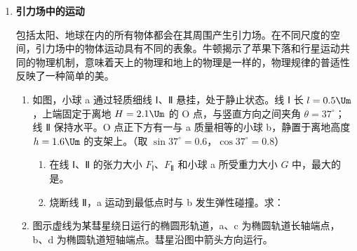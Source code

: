 \documentclass[\gkver]{gaokaozhenti}
\begin{document}
\begin{enumerate}
{（2）加偏振片只会影响激光的强度，并不会影响激光的波长，因此干涉条纹间距不变。正确选项为 B。

（3）与双缝干涉的规律类似，单缝衍射图样中央亮纹的宽度随缝宽的减小而增大、随单缝与传感器距离的增大而增大。正确选项为 AD。

2．由光子能量公式 $E = h\nu$ 和波长、频率、波速关系式 $\nu = \frac{c}{\lambda}$ 可得单个光子的能量为 $\frac{hc}{\lambda}$；由光电方程 $E_{\text{km}} = h\nu - W$ 和逸出功与截止频率关系式 $W = h\nu_{0}$ 可得逸出光电子的最大初动能 $E_{\text{km}} = \frac{hc}{\lambda} - h\nu_{0}$。
}

\item
\textbf{引力场中的运动}

包括太阳、地球在内的所有物体都会在其周围产生引力场。在不同尺度的空间，引力场中的物体运动具有不同的表象。牛顿揭示了苹果下落和行星运动共同的物理机制，意味着天上的物理和地上的物理是一样的，物理规律的普适性反映了一种简单的美。
\begin{enumerate}
	\item
	如图，小球 a 通过轻质细线 Ⅰ、Ⅱ 悬挂，处于静止状态。线 Ⅰ 长 $l = 0.5 \Um$，上端固定于离地 $H = 2.1 \Um$ 的 O 点，与竖直方向之间夹角 $\theta = 37^\circ$；线 Ⅱ 保持水平。O 点正下方有一与 a 质量相等的小球 b，静置于离地高度 $h = 1.6 \Um$ 的支架上。（取 $\sin37^\circ = 0.6$，$\cos37^\circ = 0.8$）

	\onepicture[align=right, h=2.88cm]{}
	\begin{enumerate}
		\item
		在线 Ⅰ、Ⅱ 的张力大小 $F_{\text{Ⅰ}}$、$F_{\text{Ⅱ}}$ 和小球 a 所受重力大小 $G$ 中，最大的是。

		\item
		烧断线 Ⅱ，a 运动到最低点时与 b 发生弹性碰撞。求：
	\end{enumerate}

	\item
	图示虚线为某彗星绕日运行的椭圆形轨道，a、c 为椭圆轨道长轴端点，b、d 为椭圆轨道短轴端点。彗星沿图中箭头方向运行。


\end{enumerate}
\end{enumerate}
\end{document}
